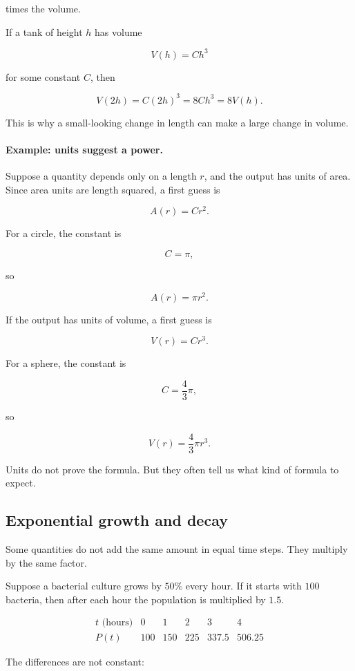 times the volume.

If a tank of height \(h\) has volume

\[
V(h)=Ch^3
\]

for some constant \(C\), then

\[
V(2h)=C(2h)^3=8Ch^3=8V(h).
\]

This is why a small-looking change in length can make a large change in volume.

\paragraph{Example: units suggest a power.}
Suppose a quantity depends only on a length \(r\), and the output has units of area. Since area units are length squared, a first guess is

\[
A(r)=Cr^2.
\]

For a circle, the constant is

\[
C=\pi,
\]

so

\[
A(r)=\pi r^2.
\]

If the output has units of volume, a first guess is

\[
V(r)=Cr^3.
\]

For a sphere, the constant is

\[
C=\frac43\pi,
\]

so

\[
V(r)=\frac43\pi r^3.
\]

Units do not prove the formula. But they often tell us what kind of formula to expect.

\subsection{Exponential growth and decay}
\label{subsec:exponential-models}

Some quantities do not add the same amount in equal time steps. They multiply by the same factor.

Suppose a bacterial culture grows by \(50\%\) every hour. If it starts with \(100\) bacteria, then after each hour the population is multiplied by \(1.5\).

\[
\begin{array}{c|ccccc}
t\text{ (hours)} & 0 & 1 & 2 & 3 & 4 \\ \hline
P(t) & 100 & 150 & 225 & 337.5 & 506.25
\end{array}
\]

The differences are not constant:


